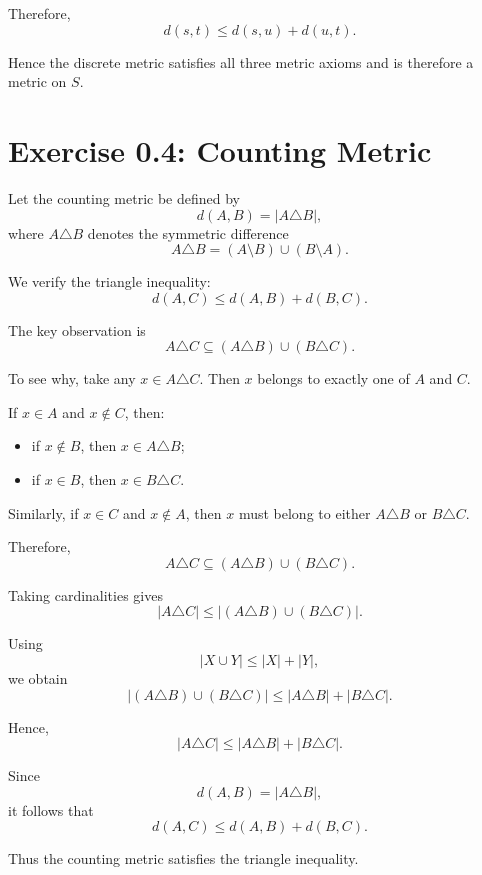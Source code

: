\documentclass[12pt]{article}
\begin{document}
Therefore,
\[
\boxed{d(s,t)\leq d(s,u)+d(u,t)}.
\]

Hence the discrete metric satisfies all three metric axioms and is therefore a metric on \(S\).

\newpage

\section*{Exercise 0.4: Counting Metric}

Let the counting metric be defined by
\[
d(A,B)=|A\triangle B|,
\]
where \(A\triangle B\) denotes the symmetric difference
\[
A\triangle B=(A\setminus B)\cup(B\setminus A).
\]

We verify the triangle inequality:
\[
d(A,C)\leq d(A,B)+d(B,C).
\]

The key observation is
\[
A\triangle C\subseteq (A\triangle B)\cup(B\triangle C).
\]

To see why, take any \(x\in A\triangle C\). Then \(x\) belongs to exactly one of \(A\) and \(C\).

If \(x\in A\) and \(x\notin C\), then:
\begin{itemize}
    \item if \(x\notin B\), then \(x\in A\triangle B\);
    \item if \(x\in B\), then \(x\in B\triangle C\).
\end{itemize}

Similarly, if \(x\in C\) and \(x\notin A\), then \(x\) must belong to either \(A\triangle B\) or \(B\triangle C\).

Therefore,
\[
A\triangle C\subseteq (A\triangle B)\cup(B\triangle C).
\]

Taking cardinalities gives
\[
|A\triangle C|
\leq
|(A\triangle B)\cup(B\triangle C)|.
\]

Using
\[
|X\cup Y|\leq |X|+|Y|,
\]
we obtain
\[
|(A\triangle B)\cup(B\triangle C)|
\leq
|A\triangle B|+|B\triangle C|.
\]

Hence,
\[
|A\triangle C|
\leq
|A\triangle B|+|B\triangle C|.
\]

Since
\[
d(A,B)=|A\triangle B|,
\]
it follows that
\[
\boxed{d(A,C)\leq d(A,B)+d(B,C)}.
\]

Thus the counting metric satisfies the triangle inequality.
\end{document}
